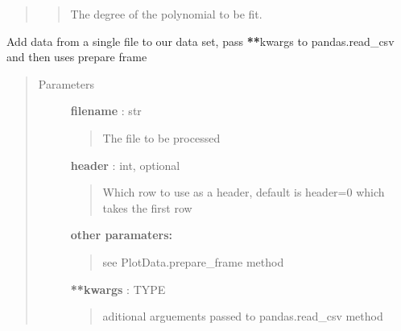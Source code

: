 \documentclass[letterpaper,10pt,english]{sphinxmanual}
\begin{document}
\begin{fulllineitems}
\begin{fulllineitems}
\begin{quote}
\begin{description}
\begin{quote}
The degree of the polynomial to be fit.
\end{quote}

\end{description}\end{quote}

\end{fulllineitems}


\begin{fulllineitems}
\label{pubplots:pubplots.plotdata.PlotData.onefile}
Add data from a single file to our data set, pass {\color{red}\bfseries{}**}kwargs to pandas.read\_csv and then
uses prepare frame
\begin{quote}\begin{description}
\item[{Parameters}] \leavevmode
\textbf{filename} : str
\begin{quote}

The file to be processed
\end{quote}

\textbf{header} : int, optional
\begin{quote}

Which row to use as a header, default is header=0 which takes the first row
\end{quote}

\textbf{other paramaters:}
\begin{quote}

see PlotData.prepare\_frame method
\end{quote}

\textbf{**kwargs} : TYPE
\begin{quote}

aditional arguements passed to pandas.read\_csv method
\end{quote}

\end{description}\end{quote}

\end{fulllineitems}



\end{fulllineitems}
\end{document}

